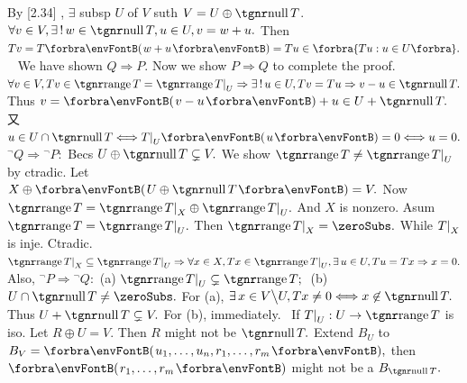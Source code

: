 By [2.34] , $\exists$ subsp $U$ of $V$ suth $V=U\oplus\null T$.\parSol{}
$\forall v\in V,\exists\,!\,w\in\null T,u\in U, v=w+u.$ Then $Tv=T\Par{w+u}=Tu\in\Bra{Tu:u\in U}.$\PfEnd\vspace{6pt}
\Corollary \,\,\,{\FontLarge\tgsl[P] \quad [Q]}\vspace{2pt}\parCor
We have shown $Q\Rightarrow P.$ Now we show $P\Rightarrow Q$ to complete the proof.\parCor
$\forall v\in V,Tv\in\range T=\range T\mmid_U\Rightarrow \exists\,!\,u\in U,Tv=Tu\Rightarrow v-u\in\null T.$\parCor Thus $v=\Par{v-u}+u\in U+\null T.$ 又 $u\in U\cap\null T\Longleftrightarrow T\mmid_U\Par{u}=0\Longleftrightarrow u=0.$\PfEnd\vspace{4pt}\parCor
\Or ${}^\neg Q\Rightarrow{}^\neg P:$ \;Becs $U\oplus\null T\subsetneq V.$ We show $\range T\neq\range T\mmid_U$ by ctradic.\parCor
Let $X\oplus\Par{U\oplus\null T}=V.$ Now $\range T=\range T\mmid_X\oplus\range T\mmid_U.$ And $X$ is nonzero.\parCor
Asum $\range T=\range T\mmid_U.$ Then $\range T\mmid_X=\zeroSubs.$ While $T\text{\normalsize|}_X$ is inje. Ctradic.\parCor
\Or $\range T\mmid_X\subseteq\range T\mmid_U\Rightarrow \forall x\in X,Tx\in\range T\mmid_U,\exists\,u\in U,Tu=Tx\Rightarrow x=0.$\vspace{4pt}\parCor
Also, ${}^\neg P\Rightarrow{}^\neg Q:$ \;(a) $\range T\mmid_U\subsetneq\range T;\;$ {\OR} (b) $U\cap\null T\neq\zeroSubs.$\parCor
For (a), $\exists\,x\in V\Backslash U,Tx\neq 0\Longleftrightarrow x\not\in\null T.$ Thus $U+\null T\subsetneq V.$ For (b), immediately.\PfEnd\vspace{4pt}
\Comment \,\,\,If $T\mmid_U:U\rightarrow\range T$ is iso. Let $R\oplus U=V.$ Then $R$ might not be $\null T.$\parCom
\Or Extend $B_U$ to $B_V=\Par{u_1,\dots,u_n,r_1,\dots,r_m},$ then $\Par{r_1,\dots,r_m}$ might not be a $B_{\null T}.$\vspace{-2pt}
\SepLine


